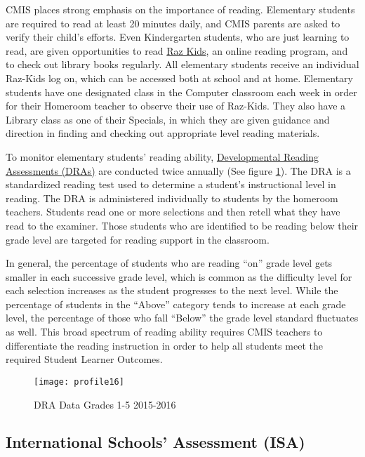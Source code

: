 CMIS places strong emphasis on the importance of reading.  Elementary students are required to read at least 20 minutes daily, and CMIS parents are asked to verify their child’s efforts.  Even Kindergarten students, who are just learning to read, are given opportunities to read \href{https://www.raz-kids.com/}{Raz Kids}, an online reading program, and to check out library books regularly.  All elementary students receive an individual Raz-Kids log on, which can be accessed both at school and at home.  Elementary students have one designated class in the Computer classroom each week in order for their Homeroom teacher to observe their use of Raz-Kids.  They also have a Library class as one of their Specials, in which they are given guidance and direction in finding and checking out appropriate level reading materials.  

To monitor elementary students’ reading ability, \href{https://drive.google.com/open?id=0ByVFfrm0zfolV29lcmM1WXVQOXc}{Developmental Reading Assessments (DRAs)} are conducted twice annually (See figure \ref{figure:DRAdata}).  The DRA is a standardized reading test used to determine a student’s instructional level in reading. The DRA is administered individually to students by the homeroom teachers. Students read one or more selections and then retell what they have read to the examiner. Those students who are identified to be reading below their grade level are targeted for reading support in the classroom. 

In general, the percentage of students who are reading “on” grade level gets smaller in each successive grade level, which is common as the difficulty level for each selection increases as the student progresses to the next level. While the percentage of students in the “Above” category tends to increase at each grade level, the percentage of those who fall “Below” the grade level standard fluctuates as well. This broad spectrum of reading ability requires CMIS teachers to differentiate the reading instruction in order to help all students meet the required Student Learner Outcomes.  

 
\begin{figure}[H]
\centering
\caption{DRA Data Grades 1-5 2015-2016}
\label{figure:DRAdata}
\texttt{[image: profile16]}
\end{figure}

\subsection{International Schools’ Assessment (ISA)}

